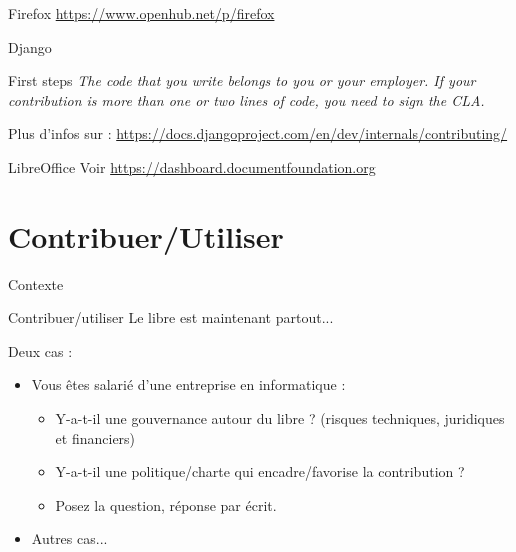 \documentclass{beamer}
\begin{document}
\begin{frame}{Firefox}
  \url{https://www.openhub.net/p/firefox}
\end{frame}

\begin{frame}{Django}

  \begin{block}{First steps}
    \textit{The code that you write belongs to you or your employer. If your contribution is more than one or two lines of code, you need to sign the CLA.}
  \end{block}

  Plus d'infos sur : \url{https://docs.djangoproject.com/en/dev/internals/contributing/}
\end{frame}


\begin{frame}{LibreOffice}
  Voir \url{https://dashboard.documentfoundation.org}
\end{frame}

\section{Contribuer/Utiliser}

\begin{frame}{Contexte}

  \begin{block}{Contribuer/utiliser}
    Le libre est maintenant partout...
  \end{block}
  Deux cas :
  \begin{itemize}
  \item Vous êtes salarié d'une entreprise en informatique :
    \begin{itemize}
    \item Y-a-t-il une gouvernance autour du libre ? (risques techniques, juridiques et financiers)
    \item Y-a-t-il une politique/charte qui encadre/favorise la contribution ?
    \item Posez la question, réponse par écrit.
    \end{itemize}
  \item Autres cas...
  \end{itemize}
  
\end{frame}
\end{document}
